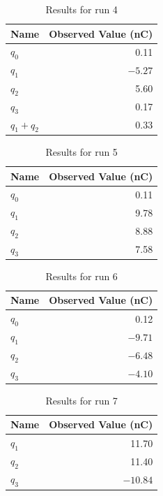 \begin{table}[ht]
	\centering
	\begin{tabular}{|l|r|}
		\hline
		Name & Observed Value (nC) \\
		\hline
		$q_{0}$ & 0.11 \\
		$q_{1}$ & $-5.27$ \\
		$q_{2}$ & 5.60 \\
		$q_{3}$ & 0.17 \\
		$q_{1} + q_{2}$ & 0.33 \\
		\hline
	\end{tabular}
	\caption{Results for run 4}
	\label{table_01_run_4}
\end{table}
\begin{table}[ht]
	\centering
	\begin{tabular}{|l|r|}
		\hline
		Name & Observed Value (nC) \\
		\hline
		$q_{0}$ & 0.11 \\
		$q_{1}$ & 9.78 \\
		$q_{2}$ & 8.88 \\
		$q_{3}$ & 7.58 \\
		\hline
	\end{tabular}
	\caption{Results for run 5}
	\label{table_01_run_5}
\end{table}
\begin{table}[ht]
	\centering
	\begin{tabular}{|l|r|}
		\hline
		Name & Observed Value (nC) \\
		\hline
		$q_{0}$ & 0.12 \\
		$q_{1}$ & $-9.71$ \\
		$q_{2}$ & $-6.48$ \\
		$q_{3}$ & $-4.10$ \\
		\hline
	\end{tabular}
	\caption{Results for run 6}
	\label{table_01_run_6}
\end{table}
\begin{table}[ht]
	\centering
	\begin{tabular}{|l|r|}
		\hline
		Name & Observed Value (nC) \\
		\hline
		$q_{1}$ & 11.70 \\
		$q_{2}$ & 11.40 \\
		$q_{3}$ & $-10.84$ \\
		\hline
	\end{tabular}
	\caption{Results for run 7}
	\label{table_01_run_7}
\end{table}
